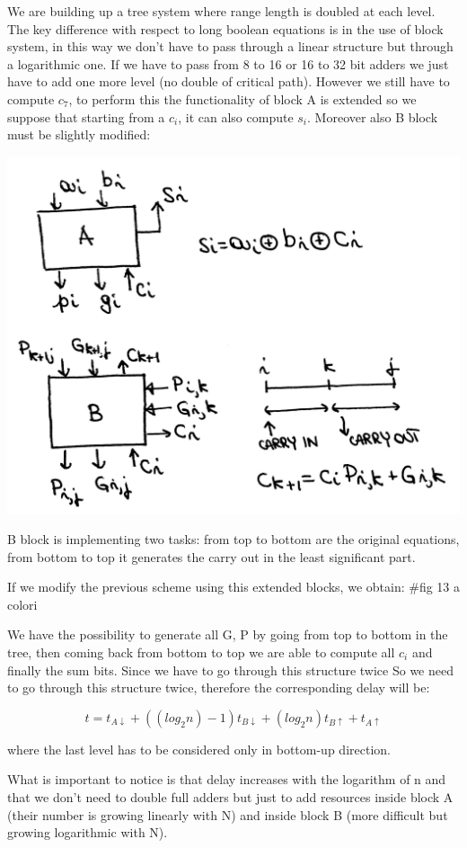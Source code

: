We are building up a tree system where range length is doubled at each level. The key difference with respect to long boolean equations is in the use of block system, in this way we don't have to pass through a linear structure but through a logarithmic one. If we have to pass from 8 to 16 or 16 to 32 bit adders we just have to add one more level (no double of critical path). However we still have to compute $c_7$, to perform this the functionality of block A is extended so we suppose that starting from a $c_i$, it can also compute $s_i$. Moreover also B block must be slightly modified:
\begin{center}
  \includegraphics[width=0.6\linewidth]{img/img2/14}
\end{center}

B block is implementing two tasks: from top to bottom are the original equations, from bottom to top it generates the carry out in the least significant part.

If we modify the previous scheme using this extended blocks, we obtain:
\#fig 13 a colori

We have the possibility to generate all G, P by going from top to bottom in the tree, then coming back from bottom to top we are able to compute all $c_i$ and finally the sum bits. Since we have to go through this structure twice So we need to go through this structure twice, therefore the corresponding delay will be:

$$t=t_{A \downarrow} + ((log_2 n)-1) t_{B \downarrow} + (log_2n)t_{B \uparrow}+t_{A \uparrow}$$

where the last level has to be considered only in bottom-up direction.

What is important to notice is that delay increases with the logarithm of n and that we don't need to double full adders but just to add resources inside block A (their number is growing linearly with N) and inside block B (more difficult but growing logarithmic with N).

